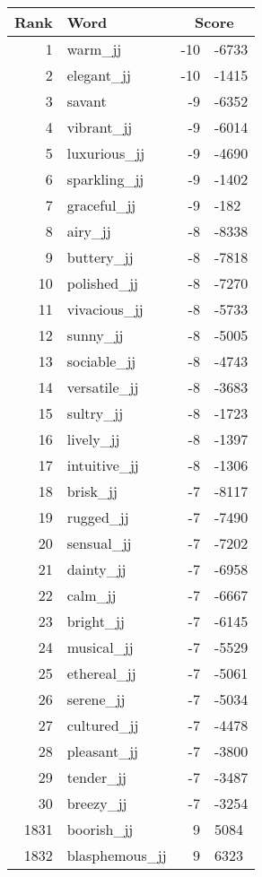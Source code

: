 \begin{longtable}[!htbp]{| rlr@{.}l |}
    \hline
    \textbf{Rank} & \textbf{Word} & \multicolumn{2}{c|}{\textbf{Score}} \\
    \hline
    \endhead
    1 & warm\_jj & -10 & -6733 \\
    2 & elegant\_jj & -10 & -1415 \\
    3 & savant & -9 & -6352 \\
    4 & vibrant\_jj & -9 & -6014 \\
    5 & luxurious\_jj & -9 & -4690 \\
    6 & sparkling\_jj & -9 & -1402 \\
    7 & graceful\_jj & -9 & -182 \\
    8 & airy\_jj & -8 & -8338 \\
    9 & buttery\_jj & -8 & -7818 \\
    10 & polished\_jj & -8 & -7270 \\
    11 & vivacious\_jj & -8 & -5733 \\
    12 & sunny\_jj & -8 & -5005 \\
    13 & sociable\_jj & -8 & -4743 \\
    14 & versatile\_jj & -8 & -3683 \\
    15 & sultry\_jj & -8 & -1723 \\
    16 & lively\_jj & -8 & -1397 \\
    17 & intuitive\_jj & -8 & -1306 \\
    18 & brisk\_jj & -7 & -8117 \\
    19 & rugged\_jj & -7 & -7490 \\
    20 & sensual\_jj & -7 & -7202 \\
    21 & dainty\_jj & -7 & -6958 \\
    22 & calm\_jj & -7 & -6667 \\
    23 & bright\_jj & -7 & -6145 \\
    24 & musical\_jj & -7 & -5529 \\
    25 & ethereal\_jj & -7 & -5061 \\
    26 & serene\_jj & -7 & -5034 \\
    27 & cultured\_jj & -7 & -4478 \\
    28 & pleasant\_jj & -7 & -3800 \\
    29 & tender\_jj & -7 & -3487 \\
    30 & breezy\_jj & -7 & -3254 \\
    1831 & boorish\_jj & 9 & 5084 \\
    1832 & blasphemous\_jj & 9 & 6323 \\

\end{longtable}
